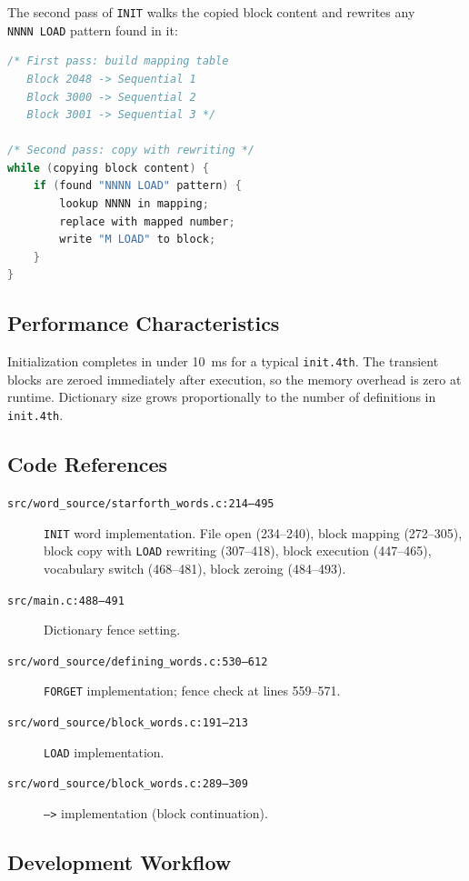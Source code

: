 The second pass of \texttt{INIT} walks the copied block content and rewrites
any \texttt{NNNN~LOAD} pattern found in it:

\begin{lstlisting}[language=C]
/* First pass: build mapping table
   Block 2048 -> Sequential 1
   Block 3000 -> Sequential 2
   Block 3001 -> Sequential 3 */

/* Second pass: copy with rewriting */
while (copying block content) {
    if (found "NNNN LOAD" pattern) {
        lookup NNNN in mapping;
        replace with mapped number;
        write "M LOAD" to block;
    }
}
\end{lstlisting}

\subsection{Performance Characteristics}

Initialization completes in under 10~ms for a typical \texttt{init.4th}. The
transient blocks are zeroed immediately after execution, so the memory
overhead is zero at runtime. Dictionary size grows proportionally to the
number of definitions in \texttt{init.4th}.

\subsection{Code References}

\begin{description}
  \item[\texttt{src/word\_source/starforth\_words.c:214--495}]
        \texttt{INIT} word implementation. File open (234--240), block
        mapping (272--305), block copy with \texttt{LOAD} rewriting
        (307--418), block execution (447--465), vocabulary switch
        (468--481), block zeroing (484--493).
  \item[\texttt{src/main.c:488--491}] Dictionary fence setting.
  \item[\texttt{src/word\_source/defining\_words.c:530--612}]
        \texttt{FORGET} implementation; fence check at lines 559--571.
  \item[\texttt{src/word\_source/block\_words.c:191--213}]
        \texttt{LOAD} implementation.
  \item[\texttt{src/word\_source/block\_words.c:289--309}]
        \texttt{-->} implementation (block continuation).
\end{description}

\subsection{Development Workflow}

